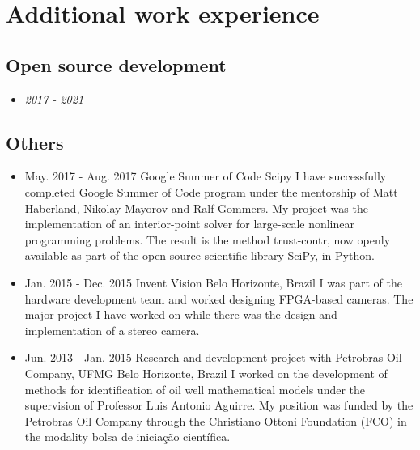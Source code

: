 \documentclass[10pt,A4]{article} %
\begin{document}
\section{Additional work experience} %

\subsection{Open source development}

\begin{itemize}
\item {}
  {}
  {\em 2017 - 2021}{}
  {}
\end{itemize}

\subsection{Others}

\begin{itemize}

    \item {}
    { May. 2017 -   Aug. 2017 }
    { Google Summer of Code }
    { Scipy }
    { I have successfully completed Google Summer of Code program under the mentorship of Matt Haberland, Nikolay Mayorov and Ralf Gommers. My project was the implementation of an interior-point solver for large-scale nonlinear programming problems. The result is the method trust-contr, now openly available as part of the open source scientific library SciPy, in Python. }

    \item {}
    { Jan. 2015 -   Dec. 2015 }
    { Invent Vision }
    { Belo Horizonte, Brazil }
    { I was part of the hardware development team and worked designing FPGA-based cameras. The major project I have worked on while there was the design and implementation of a stereo camera. }

    \item {}
    { Jun. 2013 -   Jan. 2015 }
    { Research and development project with Petrobras Oil Company, UFMG }
    { Belo Horizonte, Brazil }
    { I worked on the development of methods for identification of oil well mathematical models under the supervision of Professor Luis Antonio Aguirre. My position was funded by the Petrobras Oil Company through the Christiano Ottoni Foundation (FCO) in the modality bolsa de iniciação científica. }

\end{itemize}
\end{document}
